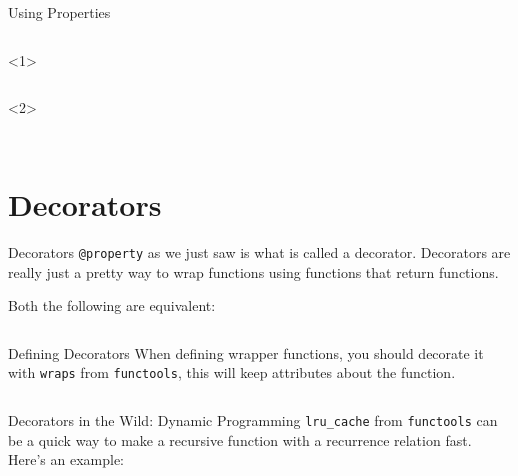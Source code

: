 \documentclass{lug}
\begin{document}
\begin{frame}{Using Properties}

    \scriptsize

    \begin{columns}
        \begin{column}{0.6\textwidth}
            \begin{onlyenv}<1>
                \inputminted{python3}{examples/camerasensorsimple.py}
            \end{onlyenv}
            \begin{onlyenv}<2>
                \inputminted{python3}{examples/camerasensorproperty.py}
            \end{onlyenv}
        \end{column}
        \begin{column}{0.4\textwidth}
            \inputminted{python3}{examples/camerasensorusage.py}
        \end{column}
    \end{columns}

\end{frame}

\section{Decorators}

\begin{frame}{Decorators}
    \texttt{@property} as we just saw is what is called a decorator. Decorators
    are really just a pretty way to wrap functions using functions that return
    functions.

    \pause

    Both the following are equivalent:
    \inputminted{python3}{examples/decorator_equiv.py}
\end{frame}

\begin{frame}{Defining Decorators}
    When defining wrapper functions, you should decorate it with \texttt{wraps}
    from \texttt{functools}, this will keep attributes about the function.
    \inputminted{python3}{examples/decorator_logging.py}
\end{frame}

\begin{frame}{Decorators in the Wild: Dynamic Programming}
    \texttt{lru\_cache} from \texttt{functools} can be a quick way to make a
    recursive function with a recurrence relation fast. Here's an example:
    \pause
    \inputminted{python3}{examples/fibonacci.py}
\end{frame}
\end{document}
